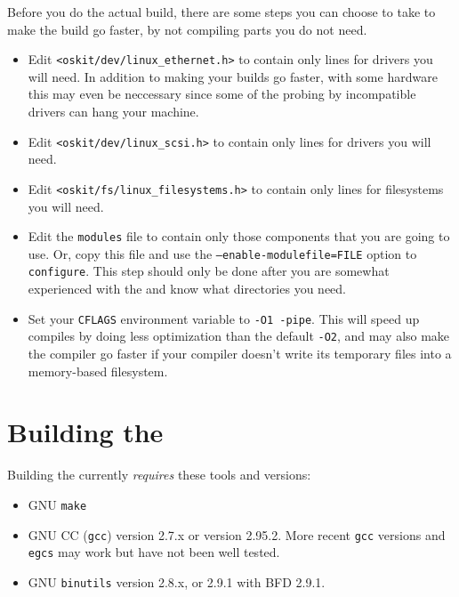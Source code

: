 Before you do the actual \oskit{} build, there are some steps you
can choose to take to make the build go faster, by not compiling parts you do not need.

\begin{itemize}
	\item Edit \texttt{<oskit/dev/linux_ethernet.h>} to contain only
	lines for drivers you will need.
	In addition to making your builds go faster,
	with some hardware this may even be neccessary since some of the probing by
	incompatible drivers can hang your machine.

	\item Edit \texttt{<oskit/dev/linux_scsi.h>} to contain only
	lines for drivers you will need.

	\item Edit \texttt{<oskit/fs/linux_filesystems.h>} to contain only
	lines for filesystems you will need.

        \item Edit the \texttt{modules} file to contain only those
        components that you are going to use.  Or, copy this file
        and use the \texttt{--enable-modulefile=FILE} option to \texttt{configure}.
	This step should only be done after you are somewhat experienced
	with the \oskit{} and know what directories you need.

	\item Set your \texttt{CFLAGS} environment variable to
	\texttt{-O1 -pipe}.
	This will speed up compiles by doing less optimization than the
	default \texttt{-O2},
	and may also make the compiler go faster if your compiler
	doesn't write its temporary files into a memory-based
	filesystem.
\end{itemize}

\section{Building the \oskit{}}

Building the \oskit{} currently \emph{requires} these tools and versions:
\begin{itemize}
\item GNU \texttt{make}

\item GNU CC (\texttt{gcc}) version 2.7.x or version 2.95.2.
	More recent \texttt{gcc} versions and \texttt{egcs} may work
	but have not been well tested.

\item GNU \texttt{binutils} version 2.8.x, or 2.9.1 with BFD 2.9.1.
\end{itemize}

